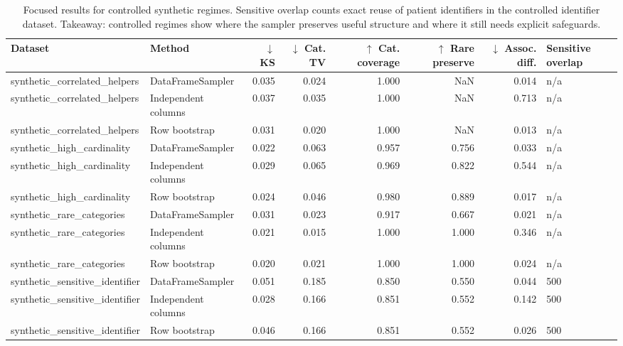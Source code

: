 \begin{table}
\caption{Focused results for controlled synthetic regimes. Sensitive overlap counts exact reuse of patient identifiers in the controlled identifier dataset. Takeaway: controlled regimes show where the sampler preserves useful structure and where it still needs explicit safeguards.}
\label{tab:synthetic-controlled-results}
\begin{adjustbox}{max width=\textwidth}
\begin{tabular}{llrrrrrl}
\toprule
Dataset & Method & $\downarrow$ KS & $\downarrow$ Cat. TV & $\uparrow$ Cat. coverage & $\uparrow$ Rare preserve & $\downarrow$ Assoc. diff. & Sensitive overlap \\
\midrule
synthetic\_correlated\_helpers & DataFrameSampler & 0.035 & 0.024 & 1.000 & NaN & 0.014 & n/a \\
synthetic\_correlated\_helpers & Independent columns & 0.037 & 0.035 & 1.000 & NaN & 0.713 & n/a \\
synthetic\_correlated\_helpers & Row bootstrap & 0.031 & 0.020 & 1.000 & NaN & 0.013 & n/a \\
synthetic\_high\_cardinality & DataFrameSampler & 0.022 & 0.063 & 0.957 & 0.756 & 0.033 & n/a \\
synthetic\_high\_cardinality & Independent columns & 0.029 & 0.065 & 0.969 & 0.822 & 0.544 & n/a \\
synthetic\_high\_cardinality & Row bootstrap & 0.024 & 0.046 & 0.980 & 0.889 & 0.017 & n/a \\
synthetic\_rare\_categories & DataFrameSampler & 0.031 & 0.023 & 0.917 & 0.667 & 0.021 & n/a \\
synthetic\_rare\_categories & Independent columns & 0.021 & 0.015 & 1.000 & 1.000 & 0.346 & n/a \\
synthetic\_rare\_categories & Row bootstrap & 0.020 & 0.021 & 1.000 & 1.000 & 0.024 & n/a \\
synthetic\_sensitive\_identifier & DataFrameSampler & 0.051 & 0.185 & 0.850 & 0.550 & 0.044 & 500 \\
synthetic\_sensitive\_identifier & Independent columns & 0.028 & 0.166 & 0.851 & 0.552 & 0.142 & 500 \\
synthetic\_sensitive\_identifier & Row bootstrap & 0.046 & 0.166 & 0.851 & 0.552 & 0.026 & 500 \\
\bottomrule
\end{tabular}
\end{adjustbox}
\end{table}
